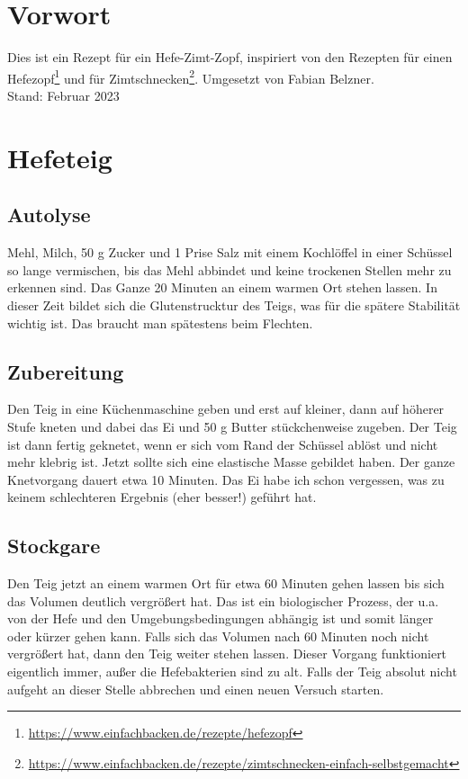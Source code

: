 \documentclass[a4paper, oneside]{recipe}
\begin{document}

\section*{Vorwort}
Dies ist ein Rezept für ein Hefe-Zimt-Zopf, inspiriert von den Rezepten für einen Hefezopf\footnote{\url{https://www.einfachbacken.de/rezepte/hefezopf}} und für Zimtschnecken\footnote{\url{https://www.einfachbacken.de/rezepte/zimtschnecken-einfach-selbstgemacht}}. Umgesetzt von Fabian Belzner.\\

Stand: Februar 2023

\section*{Hefeteig}
\subsection*{Autolyse}
Mehl, Milch, 50 g Zucker und 1 Prise Salz mit einem Kochlöffel in einer Schüssel so lange vermischen, bis das Mehl abbindet und keine trockenen Stellen mehr zu erkennen sind. Das Ganze 20 Minuten an einem warmen Ort stehen lassen. In dieser Zeit bildet sich die Glutenstrucktur des Teigs, was für die spätere Stabilität wichtig ist. Das braucht man spätestens beim Flechten.

\subsection*{Zubereitung}
Den Teig in eine Küchenmaschine geben und erst auf kleiner, dann auf höherer Stufe kneten und dabei das Ei und 50 g Butter stückchenweise zugeben. Der Teig ist dann fertig geknetet, wenn er sich vom Rand der Schüssel ablöst und nicht mehr klebrig ist. Jetzt sollte sich eine elastische Masse gebildet haben. Der ganze Knetvorgang dauert etwa 10 Minuten. Das Ei habe ich schon vergessen, was zu keinem schlechteren Ergebnis (eher besser!) geführt hat.

\subsection*{Stockgare}
Den Teig jetzt an einem warmen Ort für etwa 60 Minuten gehen lassen bis sich das Volumen deutlich vergrößert hat. Das ist ein biologischer Prozess, der u.a. von der Hefe und den Umgebungsbedingungen abhängig ist und somit länger oder kürzer gehen kann. Falls sich das Volumen nach 60 Minuten noch nicht vergrößert hat, dann den Teig weiter stehen lassen. Dieser Vorgang funktioniert eigentlich immer, außer die Hefebakterien sind zu alt. Falls der Teig absolut nicht aufgeht an dieser Stelle abbrechen und einen neuen Versuch starten. 
\end{document}
